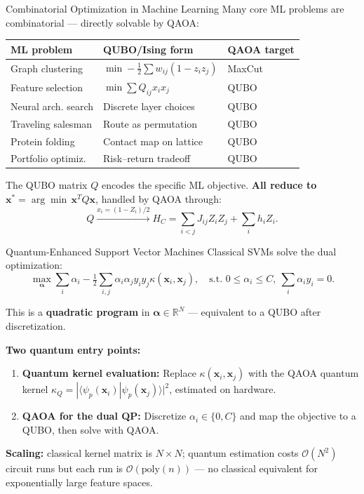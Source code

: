\documentclass{beamer}
\begin{document}

\begin{frame}{Combinatorial Optimization in Machine Learning}
Many core ML problems are combinatorial — directly solvable by QAOA:

\medskip

\begin{center}
\small
\begin{tabular}{lll}
\hline
\textbf{ML problem} & \textbf{QUBO/Ising form} & \textbf{QAOA target} \\
\hline
Graph clustering & $\min -\tfrac{1}{2}\sum w_{ij}(1-z_iz_j)$ & MaxCut \\
Feature selection & $\min \sum Q_{ij}x_ix_j$ & QUBO \\
Neural arch. search & Discrete layer choices & QUBO \\
Traveling salesman & Route as permutation & QUBO \\
Protein folding & Contact map on lattice & QUBO \\
Portfolio optimiz. & Risk–return tradeoff & QUBO \\
\hline
\end{tabular}
\end{center}

\medskip

The QUBO matrix $Q$ encodes the specific ML objective.
\textbf{All reduce to} $\mathbf{x}^*=\arg\min\,\mathbf{x}^TQ\mathbf{x}$,
handled by QAOA through:
\[
Q \xrightarrow{x_i=(1-Z_i)/2} H_C = \sum_{i<j}J_{ij}Z_iZ_j+\sum_i h_iZ_i.
\]
\end{frame}


\begin{frame}{Quantum-Enhanced Support Vector Machines}
Classical SVMs solve the dual optimization:
\[
\max_{\boldsymbol{\alpha}}\sum_i\alpha_i
- \tfrac{1}{2}\sum_{i,j}\alpha_i\alpha_j y_iy_j\kappa(\mathbf{x}_i,\mathbf{x}_j),
\quad
\text{s.t. } 0\le\alpha_i\le C,\ \sum_i\alpha_iy_i=0.
\]

This is a \textbf{quadratic program} in $\boldsymbol{\alpha}\in\mathbb{R}^N$ —
equivalent to a QUBO after discretization.

\medskip

\textbf{Two quantum entry points:}
\begin{enumerate}
\item \textbf{Quantum kernel evaluation:}  Replace $\kappa(\mathbf{x}_i,\mathbf{x}_j)$
  with the QAOA quantum kernel
  $\kappa_Q = |\langle\psi_p(\mathbf{x}_i)|\psi_p(\mathbf{x}_j)\rangle|^2$,
  estimated on hardware.
\item \textbf{QAOA for the dual QP:}  Discretize $\alpha_i\in\{0,C\}$
  and map the objective to a QUBO, then solve with QAOA.
\end{enumerate}

\medskip

\textbf{Scaling:} classical kernel matrix is $N\times N$; quantum
estimation costs $\mathcal{O}(N^2)$ circuit runs but each run is
$\mathcal{O}(\mathrm{poly}(n))$ — no classical equivalent for
exponentially large feature spaces.
\end{frame}
\end{document}
